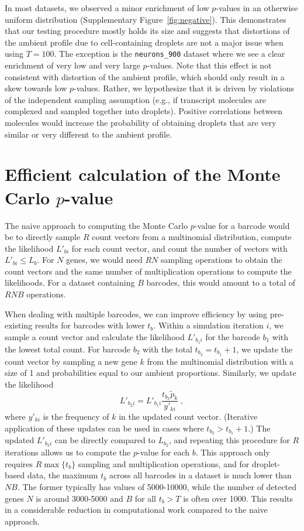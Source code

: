 \documentclass{article}
\newcommand{\code}[1]{\texttt{#1}}
\begin{document}
In most datasets, we observed a minor enrichment of low $p$-values in an otherwise uniform distribution (Supplementary Figure~\ref{fig:negative}). 
This demonstrates that our testing procedure mostly holds its size and suggests that distortions of the ambient profile due to cell-containing droplets are not a major issue when using $T=100$.
The exception is the \code{neurons\_900} dataset where we see a clear enrichment of very low and very large $p$-values.
Note that  this effect is not consistent with distortion of the ambient profile, which should only result in a skew towards low $p$-values.
Rather, we hypothesize that it is driven by violations of the independent sampling assumption (e.g., if transcript molecules are complexed and sampled together into droplets).
Positive correlations between molecules would increase the probability of obtaining droplets that are very similar or very different to the ambient profile.

\section*{Efficient calculation of the Monte Carlo $p$-value}
The naive approach to computing the Monte Carlo $p$-value for a barcode would be to directly sample $R$ count vectors from a multinomial distribution,
compute the likelihood $L'_{bi}$ for each count vector, and count the number of vectors with $L'_{bi} \le L_{b}$.
For $N$ genes, we would need $RN$ sampling operations to obtain the count vectors and the same number of multiplication operations to compute the likelihoods.
For a dataset containing $B$ barcodes, this would amount to a total of $RNB$ operations.

When dealing with multiple barcodes, we can improve efficiency by using pre-existing results for barcodes with lower $t_b$.
Within a simulation iteration $i$, we sample a count vector and calculate the likelihood $L'_{b_1i}$ for the barcode $b_1$ with the lowest total count.
For barcode $b_2$ with the total $t_{b_2}=t_{b_1}+1$, we update the count vector by sampling a new gene $k$ from the multinomial distribution with a size of 1 and probabilities equal to our ambient proportions.
Similarly, we update the likelihood 
\[
    L'_{b_2i} = L'_{b_1i} \frac{t_{b_2} \tilde{p}_k}{y'_{ki}} \;,
\]
where $y'_{ki}$ is the frequency of $k$ in the updated count vector.
(Iterative application of these updates can be used in cases where $t_{b_2} > t_{b_1}+1$.)
The updated $L'_{b_2i}$ can be directly compared to $L_{b_2}$, and repeating this procedure for $R$ iterations allows us to compute the $p$-value for each $b$.
This approach only requires $R \max\{t_b\}$ sampling and multiplication operations, 
and for droplet-based data, the maximum $t_b$ across all barcodes in a dataset is much lower than $NB$.
The former typically has values of 5000-10000, while the number of detected genes $N$ is around 3000-5000 and $B$ for all $t_b > T$ is often over 1000.
This results in a considerable reduction in computational work compared to the naive approach.
\end{document}
